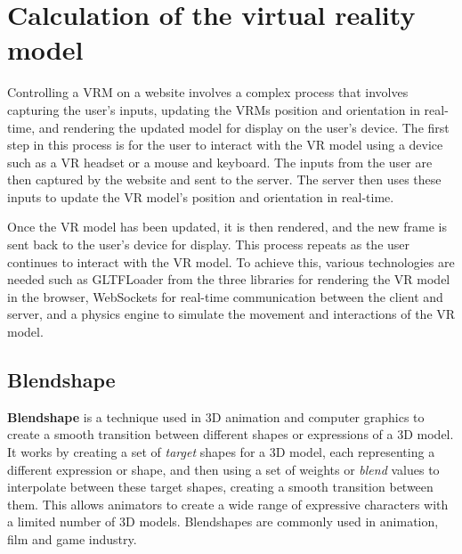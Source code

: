 \section{Calculation of the virtual reality model} 
Controlling a VRM on a website involves a complex process that involves 
capturing the user's inputs, updating the VRMs position and orientation in real-time, 
and rendering the updated model for display on the user's device.
The first step in this process is for the user to interact with the VR model 
using a device such as a VR headset or a mouse and keyboard. The inputs from the 
user are then captured by the website and sent to the server. The server then 
uses these inputs to update the VR model's position and orientation in real-time. 

Once the VR model has been updated, it is then rendered, and the new frame is 
sent back to the user's device for display. This process repeats as the user 
continues to interact with the VR model. 
To achieve this, various technologies are needed such as GLTFLoader from the three
libraries for rendering the VR model in the browser, WebSockets for real-time 
communication between the client and server, and a physics engine to simulate 
the movement and interactions of the VR model. 

\subsection{Blendshape}
\textbf{Blendshape} is a technique used in 3D animation and computer graphics to create a smooth transition between different shapes or expressions of a 3D model. 
It works by creating a set of \emph{target} shapes for a 3D model, each representing a different expression or shape, 
and then using a set of weights or \emph{blend} values to interpolate between these target shapes, creating a 
smooth transition between them. This allows animators to create a wide range of expressive characters with a 
limited number of 3D models. Blendshapes are commonly used in animation, film and game industry.

